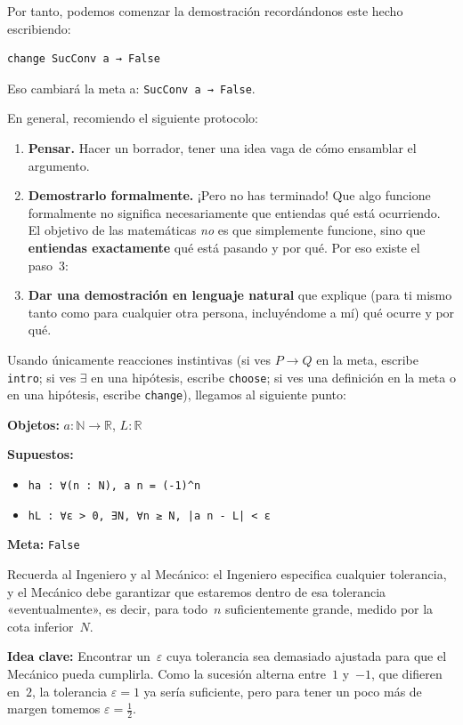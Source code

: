 Por tanto, podemos comenzar la demostración recordándonos este hecho escribiendo:
\begin{verbatim}
change SucConv a → False
\end{verbatim}
Eso cambiará la meta a: \texttt{SucConv a → False}.

En general, recomiendo el siguiente protocolo:

\begin{enumerate}
  \item \textbf{Pensar.} Hacer un borrador, tener una idea vaga de cómo
        ensamblar el argumento.
  \item \textbf{Demostrarlo formalmente.} ¡Pero no has terminado! Que algo
        funcione formalmente no significa necesariamente que entiendas qué está
        ocurriendo. El objetivo de las matemáticas \emph{no} es que simplemente
        funcione, sino que \textbf{entiendas exactamente} qué está pasando y por
        qué. Por eso existe el paso~3:
  \item \textbf{Dar una demostración en lenguaje natural} que explique
        (para ti mismo tanto como para cualquier otra persona, incluyéndome a
        mí) qué ocurre y por qué.
\end{enumerate}

Usando únicamente reacciones instintivas (si ves $P \to Q$ en la meta,
escribe \texttt{intro}; si ves $\exists$ en una hipótesis, escribe
\texttt{choose}; si ves una definición en la meta o en una hipótesis,
escribe \texttt{change}), llegamos al siguiente punto:

\medskip
\noindent\textbf{Objetos:} $a : \mathbb{N} \to \mathbb{R}$, $L : \mathbb{R}$

\noindent\textbf{Supuestos:}
\begin{itemize}
  \item \texttt{ha : ∀(n : N), a n = (-1)\^{}n}
  \item \texttt{hL : ∀ε > 0, ∃N, ∀n ≥ N, |a n - L| < ε}
\end{itemize}

\noindent\textbf{Meta:} \texttt{False}

\medskip
Recuerda al Ingeniero y al Mecánico: el Ingeniero especifica cualquier
tolerancia, y el Mecánico debe garantizar que estaremos dentro de esa
tolerancia «eventualmente», es decir, para todo~$n$ suficientemente grande,
medido por la cota inferior~$N$.

\medskip
\noindent\textbf{Idea clave:} Encontrar un~$\varepsilon$ cuya tolerancia sea
demasiado ajustada para que el Mecánico pueda cumplirla. Como la sucesión
alterna entre~$1$ y~$-1$, que difieren en~$2$, la tolerancia $\varepsilon = 1$
ya sería suficiente, pero para tener un poco más de margen tomemos
$\varepsilon = \tfrac{1}{2}$.

